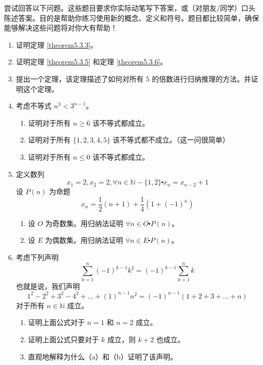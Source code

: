 尝试回答以下问题。这些题目要求你实际动笔写下答案，或（对朋友/同学）口头陈述答案。目的是帮助你练习使用新的概念、定义和符号。题目都比较简单，确保能够解决这些问题将对你大有帮助！

\begin{enumerate}[label=(\arabic*)]
    \item 证明定理 \ref{theorem5.3.3}。 \label{exc:exercises5.3.1}
    \item 证明定理 \ref{theorem5.3.5} 和定理 \ref{theorem5.3.6}。 \label{exc:exercises5.3.2}
    \item 提出一个定理，该定理描述了如何对所有 $5$ 的倍数进行归纳推理的方法。并证明这个定理。
    \item 考虑不等式 $n^3 < 3^{n-1}$。
        \begin{enumerate}[label=(\alph*)]
            \item 证明对于所有 $n \ge 6$ 该不等式都成立。
            \item 证明对于所有 $\{1,2,3,4,5\}$ 该不等式都不成立。（这一问很简单）
            \item 证明对于所有 $n \le 0$ 该不等式都成立。
        \end{enumerate}
    \item 定义数列
        \[x_1 = 2, x_2 = 2, \forall n \in \mathbb{N} - \{1, 2\} \centerdot x_n = x_{n-2} + 1\]
        设 $P(n)$ 为命题
        \[x_n = \frac{1}{2}(n+1)+\frac{1}{4}(1+(-1)^n)\]
        \begin{enumerate}[label=(\alph*)]
            \item 设 $O$ 为奇数集。用归纳法证明 $\forall n \in O \centerdot P(n)$。
            \item 设 $E$ 为偶数集。用归纳法证明 $\forall n \in E \centerdot P(n)$。
        \end{enumerate}
    \item 考虑下列声明
        \[\sum_{k=1}^{n} (-1)^{k-1}k^2 = (-1)^{k-1}\sum_{k=1}^{n} k\]
        也就是说，我们声明
        \[1^2 - 2^2 + 3^2 - 4^2 + \dots + (1)^{n-1}n^2 = (-1)^{n-1}(1 + 2 + 3 + \dots + n)\]
        对于所有 $n \in \mathbb{N}$ 成立。
        \begin{enumerate}[label=(\alph*)]
            \item 证明上面公式对于 $n=1$ 和 $n=2$ 成立。
            \item 证明上面公式只要对于 $k$ 成立，则 $k+2$ 也成立。
            \item 直观地解释为什么（a）和（b）证明了该声明。
        \end{enumerate}
\end{enumerate}
